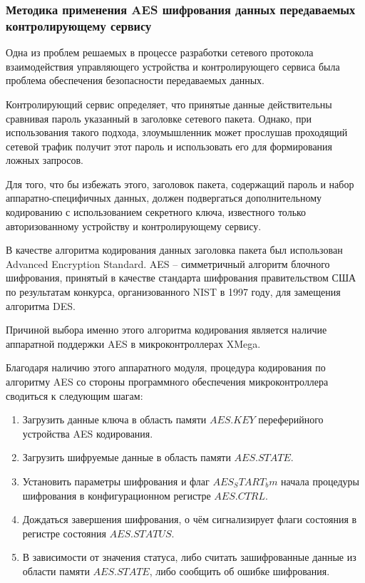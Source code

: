 \subsubsection{Методика применения AES шифрования данных передаваемых
контролирующему сервису}
Одна из проблем решаемых в процессе разработки сетевого протокола 
взаимодействия управляющего устройства и контролирующего сервиса
была проблема обеспечения безопасности передаваемых данных.


Контролирующий сервис определяет, что принятые данные действительны
сравнивая пароль указанный в заголовке сетевого пакета. Однако,
при использования такого подхода, злоумышленник может прослушав
проходящий сетевой трафик получит этот пароль и использовать его
для формирования ложных запросов.


Для того, что бы избежать этого, заголовок пакета, содержащий пароль
и набор аппаратно-специфичных данных, должен подвергаться дополнительному
кодированию с использованием секретного ключа, известного только
авторизованному устройству и контролирующему сервису.


В качестве алгоритма кодирования данных заголовка пакета был использован
Advanced Encryption Standard. AES -- симметричный алгоритм блочного
шифрования, принятый в качестве стандарта шифрования правительством США
по результатам конкурса, организованного NIST в 1997 году, для замещения
алгоритма DES.


Причиной выбора именно этого алгоритма кодирования является
наличие аппаратной поддержки AES в микроконтроллерах XMega.


Благодаря наличию этого аппаратного модуля, процедура кодирования
по алгоритму AES со стороны программного обеспечения микроконтроллера
сводиться к следующим шагам:
\begin{enumerate}
    \item{} Загрузить данные ключа в область памяти $AES.KEY$
        переферийного устройства AES кодирования.
    \item{} Загрузить шифруемые данные в область памяти $AES.STATE$.
    \item{} Установить параметры шифрования и флаг $AES_START_bm$ начала
        процедуры шифрования в конфигурационном регистре $AES.CTRL$.
    \item{} Дождаться завершения шифрования, о чём сигнализирует
        флаги состояния в регистре состояния $AES.STATUS$.
    \item{} В зависимости от значения статуса, либо считать зашифрованные
        данные из области памяти $AES.STATE$, либо сообщить об ошибке
        шифрования.
\end{enumerate}
